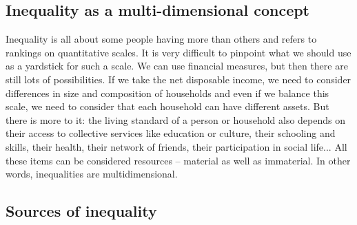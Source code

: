 \documentclass[../summary.tex]{subfiles}
\begin{document}
	\subsection{Inequality as a multi-dimensional concept}
	
	Inequality is all about some people having more than others and refers to rankings on quantitative scales. It is very difficult to pinpoint what we should use as a yardstick for such a scale. We can use financial measures, but then there are still lots of possibilities. If we take the net disposable income, we need to consider differences in size and composition of households and even if we balance this scale, we need to consider that each household can have different assets. But there is more to it: the living standard of a person or household also depends on their access to collective services like education or culture, their schooling and skills, their health, their network of friends, their participation in social life... All these items can be considered resources – material as well as immaterial. In other words, inequalities are multidimensional.  
	
	\subsection{Sources of inequality}
	
\end{document}
